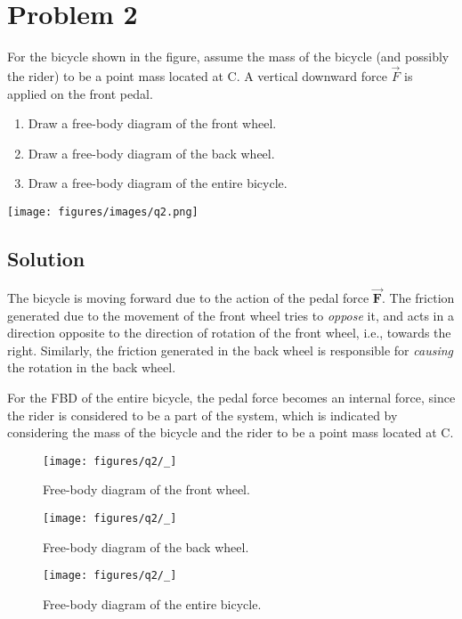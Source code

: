 \section*{Problem 2}

For the bicycle shown in the figure, assume the mass of the bicycle (and possibly the rider) to be a point mass located at C.
A vertical downward force \( \vec{F} \) is applied on the front pedal.

\begin{enumerate}[label = (\alph*)]
    \item Draw a free-body diagram of the front wheel.
    \item Draw a free-body diagram of the back wheel.
    \item Draw a free-body diagram of the entire bicycle.
\end{enumerate}

\begin{figure*}[h]
    \centering
    \texttt{[image: figures/images/q2.png]}
\end{figure*}

\subsection*{Solution}

The bicycle is moving forward due to the action of the pedal force \( \vec{\mathbf{F}} \).
The friction generated due to the movement of the front wheel tries to \textit{oppose} it, and acts in a direction opposite to the direction of rotation of the front wheel, i.e., towards the right.
Similarly, the friction generated in the back wheel is responsible for \textit{causing} the rotation in the back wheel.

For the FBD of the entire bicycle, the pedal force becomes an internal force, since the rider is considered to be a part of the system, which is indicated by considering the mass of the bicycle and the rider to be a point mass located at C.

\begin{figure}[htbp]
    \centering
    \texttt{[image: figures/q2/\_]}
    \caption{
        Free-body diagram of the front wheel.
    }
\end{figure}

\begin{figure}[htbp]
    \centering
    \texttt{[image: figures/q2/\_]}
    \caption{
        Free-body diagram of the back wheel.
    }
\end{figure}

\begin{figure}[htbp]
    \centering
    \texttt{[image: figures/q2/\_]}
    \caption{
        Free-body diagram of the entire bicycle.
    }
\end{figure}
